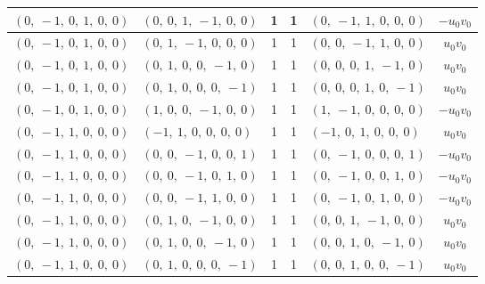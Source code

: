\documentclass[11pt]{article}
\theoremstyle{definition}
\begin{document}
\begin{longtable}{|l|l|c|c|l|c|}
    \hline
    $\left( 0, \  -1, \  0, \  1, \  0, \  0\right)$ & $\left( 0, \  0, \  1, \  -1, \  0, \  0\right)$ & 1 & 1 & $\left( 0, \  -1, \  1, \  0, \  0, \  0\right)$ & $- u_{0} v_{0}$ \\
    \hline
    $\left( 0, \  -1, \  0, \  1, \  0, \  0\right)$ & $\left( 0, \  1, \  -1, \  0, \  0, \  0\right)$ & 1 & 1 & $\left( 0, \  0, \  -1, \  1, \  0, \  0\right)$ & $u_{0} v_{0}$ \\
    \hline
    $\left( 0, \  -1, \  0, \  1, \  0, \  0\right)$ & $\left( 0, \  1, \  0, \  0, \  -1, \  0\right)$ & 1 & 1 & $\left( 0, \  0, \  0, \  1, \  -1, \  0\right)$ & $u_{0} v_{0}$ \\
    \hline
    $\left( 0, \  -1, \  0, \  1, \  0, \  0\right)$ & $\left( 0, \  1, \  0, \  0, \  0, \  -1\right)$ & 1 & 1 & $\left( 0, \  0, \  0, \  1, \  0, \  -1\right)$ & $u_{0} v_{0}$ \\
    \hline
    $\left( 0, \  -1, \  0, \  1, \  0, \  0\right)$ & $\left( 1, \  0, \  0, \  -1, \  0, \  0\right)$ & 1 & 1 & $\left( 1, \  -1, \  0, \  0, \  0, \  0\right)$ & $- u_{0} v_{0}$ \\
    \hline
    $\left( 0, \  -1, \  1, \  0, \  0, \  0\right)$ & $\left( -1, \  1, \  0, \  0, \  0, \  0\right)$ & 1 & 1 & $\left( -1, \  0, \  1, \  0, \  0, \  0\right)$ & $u_{0} v_{0}$ \\
    \hline
    $\left( 0, \  -1, \  1, \  0, \  0, \  0\right)$ & $\left( 0, \  0, \  -1, \  0, \  0, \  1\right)$ & 1 & 1 & $\left( 0, \  -1, \  0, \  0, \  0, \  1\right)$ & $- u_{0} v_{0}$ \\
    \hline
    $\left( 0, \  -1, \  1, \  0, \  0, \  0\right)$ & $\left( 0, \  0, \  -1, \  0, \  1, \  0\right)$ & 1 & 1 & $\left( 0, \  -1, \  0, \  0, \  1, \  0\right)$ & $- u_{0} v_{0}$ \\
    \hline
    $\left( 0, \  -1, \  1, \  0, \  0, \  0\right)$ & $\left( 0, \  0, \  -1, \  1, \  0, \  0\right)$ & 1 & 1 & $\left( 0, \  -1, \  0, \  1, \  0, \  0\right)$ & $- u_{0} v_{0}$ \\
    \hline
    $\left( 0, \  -1, \  1, \  0, \  0, \  0\right)$ & $\left( 0, \  1, \  0, \  -1, \  0, \  0\right)$ & 1 & 1 & $\left( 0, \  0, \  1, \  -1, \  0, \  0\right)$ & $u_{0} v_{0}$ \\
    \hline
    $\left( 0, \  -1, \  1, \  0, \  0, \  0\right)$ & $\left( 0, \  1, \  0, \  0, \  -1, \  0\right)$ & 1 & 1 & $\left( 0, \  0, \  1, \  0, \  -1, \  0\right)$ & $u_{0} v_{0}$ \\
    \hline
    $\left( 0, \  -1, \  1, \  0, \  0, \  0\right)$ & $\left( 0, \  1, \  0, \  0, \  0, \  -1\right)$ & 1 & 1 & $\left( 0, \  0, \  1, \  0, \  0, \  -1\right)$ & $u_{0} v_{0}$ \\

\end{longtable}
\end{document}
